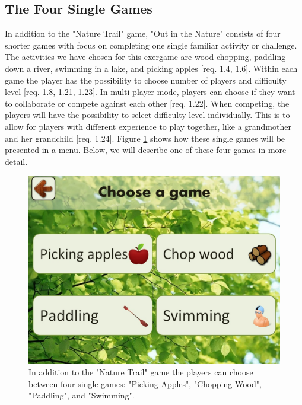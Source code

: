 \subsection{The Four Single Games}
In addition to the "Nature Trail" game, "Out in the Nature" consists of four shorter games with focus on completing one single familiar activity or challenge. The activities we have chosen for this exergame are wood chopping, paddling down a river, swimming in a lake, and picking apples [req. 1.4, 1.6]. Within each game the player has the possibility to choose number of players and difficulty level [req. 1.8, 1.21, 1.23]. In multi-player mode, players can choose if they want to collaborate or compete against each other [req. 1.22]. When competing, the players will have the possibility to select difficulty level individually. This is to allow for players with different experience to play together, like a grandmother and her grandchild [req. 1.24]. Figure \ref{fig:velgSpill} shows how these single games will be presented in a menu. Below, we will describe one of these four games in more detail.

\begin{figure} [H]
\centering
\includegraphics[scale=0.25]{chooseGame.jpg}
\caption[The four single games]{In addition to the "Nature Trail" game the players can choose between four single games: "Picking Apples", "Chopping Wood", "Paddling", and "Swimming".}
\label{fig:velgSpill}
\end{figure}

